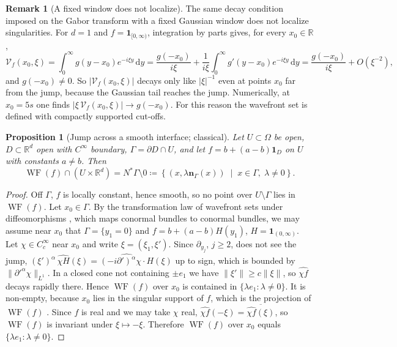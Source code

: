\documentclass[11pt,a4paper,reqno]{amsart}
\newtheorem{proposition}[theorem]{Proposition}
\theoremstyle{definition}
\newtheorem{remark}[theorem]{Remark}
\numberwithin{equation}{section}
\newcommand{\R}{\mathbb{R}}
\newcommand{\dif}{\,\mathrm{d}}
\newcommand{\WF}{\operatorname{WF}}
\begin{document}
\begin{remark}[A fixed window does not localize]
\label{rem:fixed_window}
The same decay condition imposed on the Gabor transform with a fixed Gaussian window does not localize singularities. For $d = 1$ and $f = \mathbf{1}_{[0,\infty)}$, integration by parts gives, for every $x_0 \in \R$,
\begin{equation}
    \mathcal{V}_f(x_0, \xi) = \int_0^\infty g(y - x_0) e^{-i\xi y} \dif y = \frac{g(-x_0)}{i\xi} + \frac{1}{i\xi}\int_0^\infty g'(y - x_0) e^{-i\xi y}\dif y = \frac{g(-x_0)}{i\xi} + O(\xi^{-2}),
\end{equation}
and $g(-x_0) \ne 0$. So $|\mathcal{V}_f(x_0,\xi)|$ decays only like $|\xi|^{-1}$ even at points $x_0$ far from the jump, because the Gaussian tail reaches the jump. Numerically, at $x_0 = 5s$ one finds $|\xi\, \mathcal{V}_f(x_0,\xi)| \to g(-x_0)$. For this reason the wavefront set is defined with compactly supported cut-offs.
\end{remark}

\begin{proposition}[Jump across a smooth interface; classical]
\label{thm:wavefront_interface}
Let $U \subset \Omega$ be open, $D \subset \R^d$ open with $C^\infty$ boundary, $\Gamma = \partial D \cap U$, and let $f = b + (a - b)\mathbf{1}_D$ on $U$ with constants $a \ne b$. Then
\begin{equation}
    \WF(f) \cap (U \times \R^d) = N^*\Gamma \setminus 0 \coloneqq \left\{ (x, \lambda \mathbf{n}_\Gamma(x)) \;\middle|\; x \in \Gamma, \; \lambda \ne 0 \right\}.
\end{equation}
\end{proposition}

\begin{proof}
Off $\Gamma$, $f$ is locally constant, hence smooth, so no point over $U \setminus \Gamma$ lies in $\WF(f)$. Let $x_0 \in \Gamma$. By the transformation law of wavefront sets under diffeomorphisms \cite[Sect.~8.2]{hormander2003analysis}, which maps conormal bundles to conormal bundles, we may assume near $x_0$ that $\Gamma = \{y_1 = 0\}$ and $f = b + (a-b)H(y_1)$, $H = \mathbf{1}_{(0,\infty)}$. Let $\chi \in C_c^\infty$ near $x_0$ and write $\xi = (\xi_1, \xi')$. Since $\partial_{y_j}$, $j \ge 2$, does not see the jump, $(\xi')^{\alpha}\, \widehat{\chi H}(\xi) = \widehat{(-i\partial')^{\alpha}\chi \cdot H}(\xi)$ up to sign, which is bounded by $\|\partial'^{\alpha}\chi\|_{L^1}$. In a closed cone not containing $\pm e_1$ we have $\|\xi'\| \ge c\|\xi\|$, so $\widehat{\chi f}$ decays rapidly there. Hence $\WF(f)$ over $x_0$ is contained in $\{\lambda e_1 : \lambda \ne 0\}$. It is non-empty, because $x_0$ lies in the singular support of $f$, which is the projection of $\WF(f)$ \cite[Sect.~8.1]{hormander2003analysis}. Since $f$ is real and we may take $\chi$ real, $\widehat{\chi f}(-\xi) = \overline{\widehat{\chi f}(\xi)}$, so $\WF(f)$ is invariant under $\xi \mapsto -\xi$. Therefore $\WF(f)$ over $x_0$ equals $\{\lambda e_1 : \lambda \ne 0\}$.
\end{proof}
\end{document}
